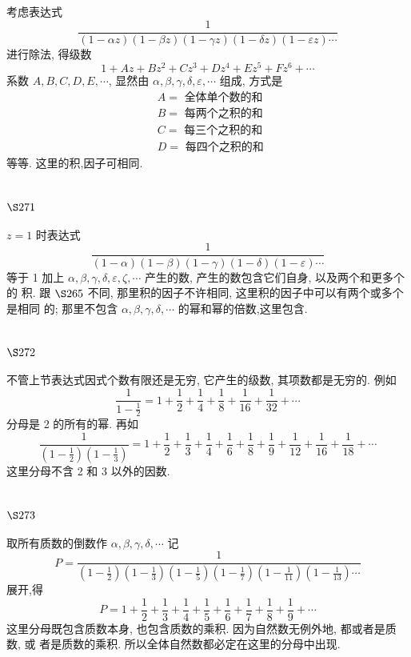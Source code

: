 考虑表达式
\[
\frac{1}{(1-\alpha z)(1-\beta z)(1-\gamma z)(1-\delta z)(1-\varepsilon z) \cdots}
\]
进行除法, 得级数
\[
1+A z+B z^{2}+C z^{3}+D z^{4}+E z^{5}+F z^{6}+\cdots
\]
系数 $A, B, C, D, E, \cdots$, 显然由 $\alpha, \beta, \gamma, \delta, \varepsilon, \cdots$ 组成, 方式是
\[
\begin{aligned}
& A=\text { 全体单个数的和 } \\
& B=\text { 每两个之积的和 } \\
& C=\text { 每三个之积的和 } \\
& D=\text { 每四个之积的和 }
\end{aligned}
\]
等等. 这里的积,因子可相同.

\section{$\S 271$}

$z=1$ 时表达式
\[
\frac{1}{(1-\alpha)(1-\beta)(1-\gamma)(1-\delta)(1-\varepsilon) \cdots}
\]
等于 1 加上 $\alpha, \beta, \gamma, \delta, \varepsilon, \zeta, \cdots$ 产生的数, 产生的数包含它们自身, 以及两个和更多个的 积. 跟 $\S 265$ 不同, 那里积的因子不许相同, 这里积的因子中可以有两个或多个是相同 的; 那里不包含 $\alpha, \beta, \gamma, \delta, \cdots$ 的幂和幂的倍数,这里包含.

\section{$\S 272$}

不管上节表达式因式个数有限还是无穷, 它产生的级数, 其项数都是无穷的. 例如
\[
\frac{1}{1-\frac{1}{2}}=1+\frac{1}{2}+\frac{1}{4}+\frac{1}{8}+\frac{1}{16}+\frac{1}{32}+\cdots
\]
分母是 2 的所有的幂. 再如
\[
\frac{1}{\left(1-\frac{1}{2}\right)\left(1-\frac{1}{3}\right)}=1+\frac{1}{2}+\frac{1}{3}+\frac{1}{4}+\frac{1}{6}+\frac{1}{8}+\frac{1}{9}+\frac{1}{12}+\frac{1}{16}+\frac{1}{18}+\cdots
\]
这里分母不含 2 和 3 以外的因数. 

\section{$\S 273$}

取所有质数的倒数作 $\alpha, \beta, \gamma, \delta, \cdots$ 记
\[
P=\frac{1}{\left(1-\frac{1}{2}\right)\left(1-\frac{1}{3}\right)\left(1-\frac{1}{5}\right)\left(1-\frac{1}{7}\right)\left(1-\frac{1}{11}\right)\left(1-\frac{1}{13}\right) \cdots}
\]
展开,得
\[
P=1+\frac{1}{2}+\frac{1}{3}+\frac{1}{4}+\frac{1}{5}+\frac{1}{6}+\frac{1}{7}+\frac{1}{8}+\frac{1}{9}+\cdots
\]
这里分母既包含质数本身, 也包含质数的乘积. 因为自然数无例外地, 都或者是质数, 或 者是质数的乘积. 所以全体自然数都必定在这里的分母中出现.

